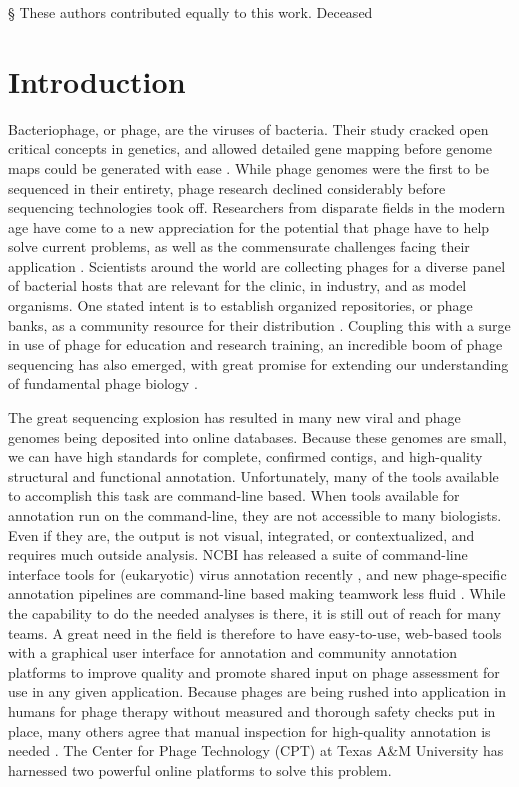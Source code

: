 § These authors contributed equally to this work.
\dag Deceased


\section*{Introduction}

Bacteriophage, or phage, are the viruses of bacteria. Their study
cracked open critical concepts in genetics, and allowed detailed gene
mapping before genome maps could be generated with ease \cite{Ofir_2018,Salmond_2015}. While
phage genomes were the first to be sequenced in their entirety, phage
research declined considerably before sequencing technologies took off.
Researchers from disparate fields in the modern age have come to a new
appreciation for the potential that phage have to help solve current
problems, as well as the commensurate challenges facing their
application \cite{Young_2015}. Scientists around the world are collecting phages
for a diverse panel of bacterial hosts that are relevant for the clinic,
in industry, and as model organisms. One stated intent is to establish
organized repositories, or phage banks, as a community resource for
their distribution \cite{Pirnay_2018,Pouillot_2010}. Coupling this with a surge in use of phage
for education and research training, an incredible boom of phage
sequencing has also emerged, with great promise for extending our
understanding of fundamental phage biology \cite{Hatfull_2011}.

The great sequencing explosion has resulted in many new viral \cite{Brister_2014}
and phage genomes being deposited into online databases. Because these
genomes are small, we can have high standards for complete, confirmed
contigs, and high-quality structural and functional annotation.
Unfortunately, many of the tools available to accomplish this task are
command-line based. When tools available for annotation run on the
command-line, they are not accessible to many biologists. Even if they
are, the output is not visual, integrated, or contextualized, and
requires much outside analysis. NCBI has released a suite of
command-line interface tools for (eukaryotic) virus annotation recently
\cite{Shean_2019}, and new phage-specific annotation pipelines are command-line
based making teamwork less fluid \cite{Ecale_Zhou_2019}. While the capability to do the
needed analyses is there, it is still out of reach for many teams. A
great need in the field is therefore to have easy-to-use, web-based
tools with a graphical user interface for annotation and community
annotation platforms to improve quality and promote shared input on
phage assessment for use in any given application. Because phages are
being rushed into application in humans for phage therapy without
measured and thorough safety checks put in place, many others agree that
manual inspection for high-quality annotation is needed \cite{Philipson_2018}. The
Center for Phage Technology (CPT) at Texas A\&M University has harnessed
two powerful online platforms to solve this problem.

